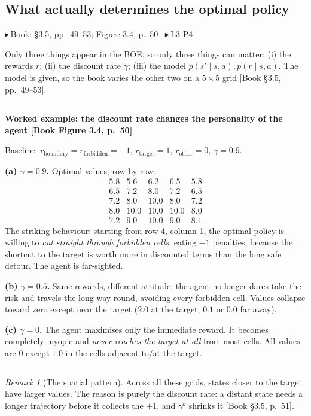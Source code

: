 \documentclass[11pt, letterpaper]{article}
\theoremstyle{runin}
\theoremstyle{runinplain}
\theoremstyle{remark}
\newtheorem*{remark}{Remark}
\newcommand{\bk}[1]{{\color{bookblue}\small$\blacktriangleright$\,\textsf{Book: #1}}}
\newcommand{\bkin}[1]{{\color{bookblue}\small[\textsf{Book #1}]}}
\newcommand{\vid}[2]{{\color{vidred}\small$\playbutton$\,\href{#2}{\textsf{#1}}}}
\newcommand{\playbutton}{\blacktriangleright}
\newenvironment{worked}[1]
  {\par\medskip\noindent\rule{\textwidth}{0.4pt}\par\nobreak\vspace{0.3em}
   \noindent\textbf{Worked example: #1}\par\nobreak\vspace{0.2em}\small}
  {\par\nobreak\vspace{0.3em}\noindent\rule{\textwidth}{0.4pt}\par\medskip}
\begin{document}
\subsection{What actually determines the optimal policy}

\bk{\S3.5, pp.~49--53; Figure 3.4, p.~50}
\ \vid{L3 P4}{https://www.youtube.com/watch?v=a--bck2ow9s}

Only three things appear in the BOE, so only three things can matter:
(i) the rewards $r$; (ii) the discount rate $\gamma$; (iii) the model
$p(s'\mid s,a),p(r\mid s,a)$. The model is given, so the book varies the other two
on a $5\times5$ grid \bkin{\S3.5, pp.~49--53}.

\begin{worked}{the discount rate changes the personality of the agent \bkin{Figure 3.4, p.~50}}
Baseline: $r_{\text{boundary}}=r_{\text{forbidden}}=-1$, $r_{\text{target}}=1$,
$r_{\text{other}}=0$, $\gamma=0.9$.

\textbf{(a) $\gamma=0.9$.} Optimal values, row by row:
\[
\begin{array}{ccccc}
5.8&5.6&6.2&6.5&5.8\\
6.5&7.2&8.0&7.2&6.5\\
7.2&8.0&10.0&8.0&7.2\\
8.0&10.0&10.0&10.0&8.0\\
7.2&9.0&10.0&9.0&8.1
\end{array}
\]
The striking behaviour: starting from row 4, column 1, the optimal policy is
willing to \emph{cut straight through forbidden cells}, eating $-1$ penalties,
because the shortcut to the target is worth more in discounted terms than the long
safe detour. The agent is far-sighted.

\textbf{(b) $\gamma=0.5$.} Same rewards, different attitude: the agent no longer
dares take the risk and travels the long way round, avoiding every forbidden cell.
Values collapse toward zero except near the target ($2.0$ at the target, $0.1$ or
$0.0$ far away).

\textbf{(c) $\gamma=0$.} The agent maximises only the immediate reward. It becomes
completely myopic and \emph{never reaches the target at all} from most cells. All
values are $0$ except $1.0$ in the cells adjacent to/at the target.
\end{worked}

\begin{remark}[The spatial pattern]
Across all these grids, states closer to the target have larger values. The reason
is purely the discount rate: a distant state needs a longer trajectory before it
collects the $+1$, and $\gamma^k$ shrinks it \bkin{\S3.5, p.~51}.
\end{remark}
\end{document}

